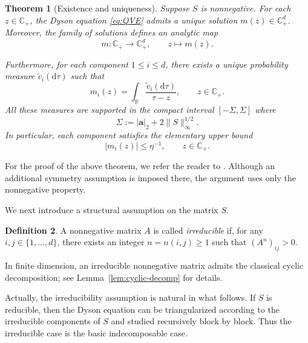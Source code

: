 \documentclass[11pt,twoside, a4paper]{article}
\numberwithin{equation}{section}
\numberwithin{figure}{section}
\theoremstyle{plain} %
\newtheorem{theorem}{Theorem}[section]
\theoremstyle{definition}
\newtheorem{definition}[theorem]{Definition}
\theoremstyle{remark}
\newcommand{\1} {\mspace{1 mu}}
\newcommand{\2} {\mspace{2 mu}}
\newcommand{\R} {\mathbb{R}}
\newcommand{\Cp} {\mathbb {C}_+}
\newcommand{\dd}{\mathrm{d}}
\begin{document}
\begin{theorem}[Existence and uniqueness]\label{thm:Existence and uniqueness}
Suppose $S$ is nonnegative. For each $z\in \Cp$, the Dyson equation \eqref{eq:QVE} admits a unique solution $m(z)\in \Cp^d$. Moreover, the family of solutions defines an analytic map
\[
m:\Cp\to\Cp^d,\qquad z\mapsto m(z).
\]

Furthermore, for each component $1\le i\le d$, there exists a unique probability measure $\tilde{v}_i(\dd\tau)$ such that
\begin{equation}\label{def.v}
    m_i(z)=\int_{\R} \frac{\tilde{v}_i(\dd \tau)}{\tau-z}, \qquad   z \in \Cp.
\end{equation}
All these measures are supported in the compact interval $[-\Sigma,\Sigma]$ where
\begin{equation}\label{def.Sigma}
\Sigma:=|\mathbf {a}|_2 + 2 \|S\|_\infty^{1/2}.
\end{equation}
In particular, each component satisfies the elementary upper bound
\begin{equation}\label{eq.rough-boundedness}
     |m_i(z)|\le \eta^{-1},\qquad z\in\Cp.
\end{equation}
\end{theorem}



For the proof of the above theorem, we refer the reader to \cite[Section 4]{AEK2019quadratic}. Although an additional symmetry assumption is imposed there, the argument uses only the nonnegative property.

\medskip

We next introduce a structural assumption on the matrix \(S\). 
\begin{definition}
    A nonnegative
matrix \(A\) is called \emph{irreducible} if, for any
\(i,j\in\{1,\dots,d\}\), there exists an integer \(n=n(i,j)\ge 1\) such that
$
    (A^n)_{ij}>0 .
$
\end{definition}
In finite dimension, an irreducible nonnegative matrix admits the classical
cyclic decomposition; see Lemma~\ref{lem:cyclic-decomp} for details.

Actually, the irreducibility assumption is natural in what follows. If \(S\) is
reducible, then the Dyson equation can be triangularized according to the irreducible
components of \(S\) and studied recursively block by block. Thus the
irreducible case is the basic indecomposable case.
\end{document}
